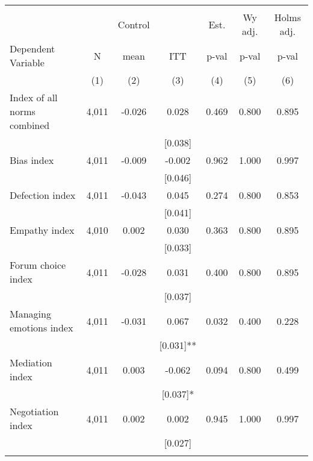 \begin{tabular}{lcccccc}
\hline \noalign{\smallskip} &  &  &  &  &  & \\
 &  & Control &  & Est. & Wy adj. & Holms adj.\\
Dependent Variable & N & mean & ITT & p-val & p-val & p-val\\
 & (1) & (2) & (3) & (4) & (5) & (6)\\
\noalign{\smallskip}\hline \noalign{\smallskip}Index of all norms combined & 4,011 & -0.026 & 0.028 & 0.469 & 0.800 & 0.895\\
 &  &  & [0.038] &  &  & \\
\quad Bias index & 4,011 & -0.009 & -0.002 & 0.962 & 1.000 & 0.997\\
 &  &  & [0.046] &  &  & \\
\quad Defection index & 4,011 & -0.043 & 0.045 & 0.274 & 0.800 & 0.853\\
 &  &  & [0.041] &  &  & \\
\quad Empathy index & 4,010 & 0.002 & 0.030 & 0.363 & 0.800 & 0.895\\
 &  &  & [0.033] &  &  & \\
\quad Forum choice index & 4,011 & -0.028 & 0.031 & 0.400 & 0.800 & 0.895\\
 &  &  & [0.037] &  &  & \\
\quad Managing emotions index & 4,011 & -0.031 & 0.067 & 0.032 & 0.400 & 0.228\\
 &  &  & [0.031]** &  &  & \\
\quad Mediation index & 4,011 & 0.003 & -0.062 & 0.094 & 0.800 & 0.499\\
 &  &  & [0.037]* &  &  & \\
\quad Negotiation index & 4,011 & 0.002 & 0.002 & 0.945 & 1.000 & 0.997\\
 &  &  & [0.027] &  &  & \\
\noalign{\smallskip}\hline\end{tabular}

